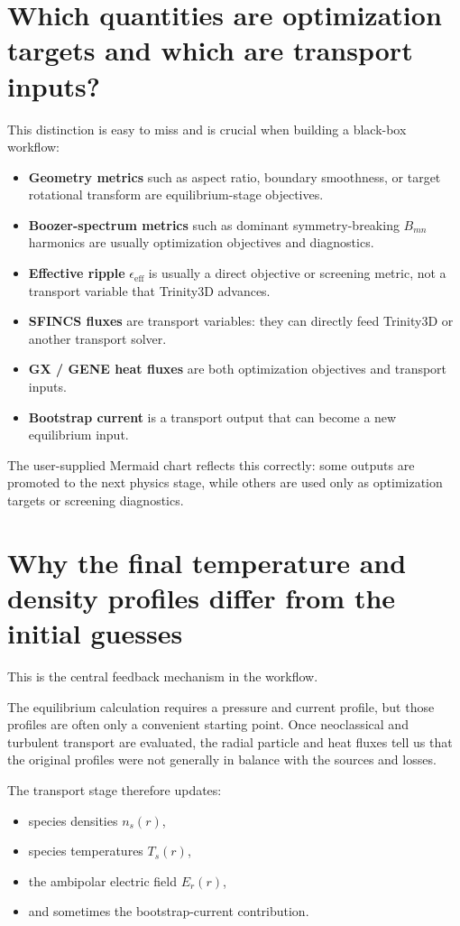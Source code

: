 \documentclass[11pt]{article}
\begin{document}
\section{Which quantities are optimization targets and which are transport inputs?}

This distinction is easy to miss and is crucial when building a black-box
workflow:

\begin{itemize}
  \item \textbf{Geometry metrics} such as aspect ratio, boundary smoothness, or target rotational transform are equilibrium-stage objectives.
  \item \textbf{Boozer-spectrum metrics} such as dominant symmetry-breaking $B_{mn}$ harmonics are usually optimization objectives and diagnostics.
  \item \textbf{Effective ripple} $\epsilon_{\mathrm{eff}}$ is usually a direct objective or screening metric, not a transport variable that Trinity3D advances.
  \item \textbf{SFINCS fluxes} are transport variables: they can directly feed Trinity3D or another transport solver.
  \item \textbf{GX / GENE heat fluxes} are both optimization objectives and transport inputs.
  \item \textbf{Bootstrap current} is a transport output that can become a new equilibrium input.
\end{itemize}

The user-supplied Mermaid chart reflects this correctly: some outputs are
promoted to the next physics stage, while others are used only as optimization
targets or screening diagnostics.

\section{Why the final temperature and density profiles differ from the initial guesses}

This is the central feedback mechanism in the workflow.

The equilibrium calculation requires a pressure and current profile, but those
profiles are often only a convenient starting point. Once neoclassical and
turbulent transport are evaluated, the radial particle and heat fluxes tell us
that the original profiles were not generally in balance with the sources and
losses.

The transport stage therefore updates:
\begin{itemize}
  \item species densities $n_s(r)$,
  \item species temperatures $T_s(r)$,
  \item the ambipolar electric field $E_r(r)$,
  \item and sometimes the bootstrap-current contribution.
\end{itemize}
\end{document}
